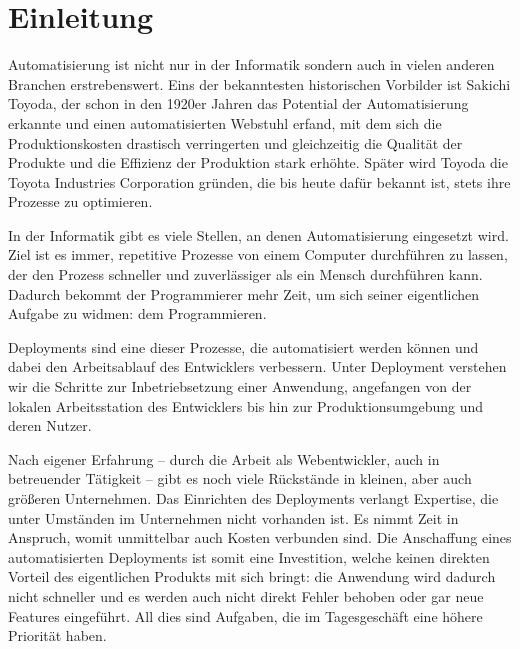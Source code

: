 
\chapter{Einleitung}
\label{ch:einleitung}

Automatisierung ist nicht nur in der Informatik sondern auch in vielen anderen Branchen erstrebenswert. Eins der bekanntesten historischen Vorbilder ist Sakichi Toyoda, der schon in den 1920er Jahren das Potential der Automatisierung erkannte und einen automatisierten Webstuhl erfand, mit dem sich die Produktionskosten drastisch verringerten und gleichzeitig die Qualität der Produkte und die Effizienz der Produktion stark erhöhte. Später wird Toyoda die Toyota Industries Corporation gründen, die bis heute dafür bekannt ist, stets ihre Prozesse zu optimieren.

In der Informatik gibt es viele Stellen, an denen Automatisierung eingesetzt wird. Ziel ist es immer, repetitive Prozesse von einem Computer durchführen zu lassen, der den Prozess schneller und zuverlässiger als ein Mensch durchführen kann. Dadurch bekommt der Programmierer mehr Zeit, um sich seiner eigentlichen Aufgabe zu widmen: dem Programmieren.

Deployments sind eine dieser Prozesse, die automatisiert werden können und dabei den Arbeitsablauf des Entwicklers verbessern. Unter Deployment verstehen wir die Schritte zur Inbetriebsetzung einer Anwendung, angefangen von der lokalen Arbeitsstation des Entwicklers bis hin zur Produktionsumgebung und deren Nutzer.

Nach eigener Erfahrung – durch die Arbeit als Webentwickler, auch in betreuender Tätigkeit – gibt es noch viele Rückstände in kleinen, aber auch größeren Unternehmen. Das Einrichten des Deployments verlangt Expertise, die unter Umständen im Unternehmen nicht vorhanden ist. Es nimmt Zeit in Anspruch, womit unmittelbar auch Kosten verbunden sind. Die Anschaffung eines automatisierten Deployments ist somit eine Investition, welche keinen direkten Vorteil des eigentlichen Produkts mit sich bringt: die Anwendung wird dadurch nicht schneller und es werden auch nicht direkt Fehler behoben oder gar neue Features eingeführt. All dies sind Aufgaben, die im Tagesgeschäft eine höhere Priorität haben.


